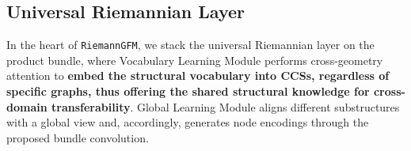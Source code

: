 






\vspace{-0.1in}
\subsection{Universal Riemannian Layer}  \label{sec:url}
In the heart of \texttt{RiemannGFM}, we stack the universal Riemannian layer on the product bundle, where
Vocabulary Learning Module  performs cross-geometry attention to \textbf{embed the structural vocabulary into CCSs, regardless of specific graphs, thus offering the shared structural knowledge for cross-domain transferability}.
Global Learning Module  aligns different substructures with a global view and, accordingly, generates node encodings through the proposed bundle convolution.

